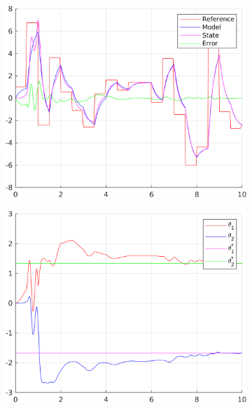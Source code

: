 \documentclass[12pt,a4paper]{article}
\begin{document}
		\begin{figure}[H]
			\centering
			\begin{subfigure}{.45\textwidth}
				\centering
				\includegraphics[width=1\textwidth]{Graphics/LinearState5.png}
			\end{subfigure}%
			\begin{subfigure}{.45\textwidth}
				\centering
				\includegraphics[width=1\textwidth]{Graphics/LinearParameters5.png}
			\end{subfigure}
			\begin{subfigure}{.45\textwidth}
				\centering

\end{subfigure}
\end{figure}
\end{document}

